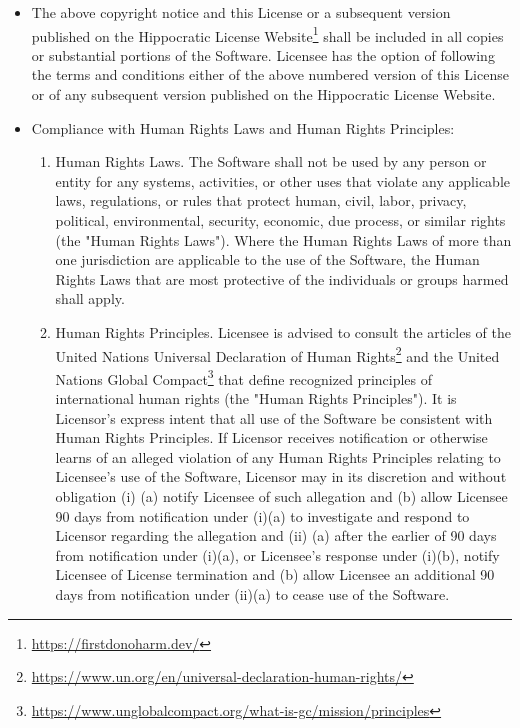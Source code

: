 \documentclass{scrbook}
\newcommand{\hreffoot}[2]{{#1}\footnote{\href{#2}{#2}}}
\begin{document}
\begin{itemize}

\item 

The above copyright notice and this License or a subsequent version published
    on the \hreffoot{Hippocratic License Website}{https://firstdonoharm.dev/} shall be
    included in all copies or substantial portions of the Software. Licensee has
    the option of following the terms and conditions either of the above
    numbered version of this License or of any subsequent version published on
    the Hippocratic License Website.



\item 

Compliance with Human Rights Laws and Human Rights Principles:

\begin{enumerate}

\item 

Human Rights Laws. The Software shall not be used by any person or
    entity for any systems, activities, or other uses that violate any
    applicable laws, regulations, or rules that protect human, civil, labor,
    privacy, political, environmental, security, economic, due process, or
    similar rights (the "Human Rights Laws"). Where the Human Rights Laws of
    more than one jurisdiction are applicable to the use of the Software,
    the Human Rights Laws that are most protective of the individuals or
    groups harmed shall apply.



\item 

Human Rights Principles. Licensee is advised to consult the articles of
    the \hreffoot{United Nations Universal Declaration of Human
    Rights}{https://www.un.org/en/universal-declaration-human-rights/} and
    the \hreffoot{United Nations Global
    Compact}{https://www.unglobalcompact.org/what-is-gc/mission/principles}
    that define recognized principles of international human rights (the
    "Human Rights Principles"). It is Licensor's express intent that all use
    of the Software be consistent with Human Rights Principles. If Licensor
    receives notification or otherwise learns of an alleged violation of any
    Human Rights Principles relating to Licensee's use of the Software,
    Licensor may in its discretion and without obligation (i) (a) notify
    Licensee of such allegation and (b) allow Licensee 90 days from
    notification under (i)(a) to investigate and respond to Licensor
    regarding the allegation and (ii) (a) after the earlier of 90 days from
    notification under (i)(a), or Licensee's response under (i)(b), notify
    Licensee of License termination and (b) allow Licensee an additional 90
    days from notification under (ii)(a) to cease use of the Software.




\end{enumerate}
\end{itemize}
\end{document}
